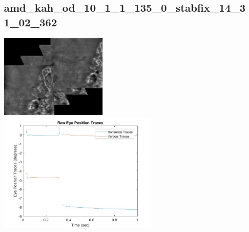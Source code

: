 \documentclass[11pt]{article}
\begin{document}
\subsection{amd\_kah\_od\_10\_1\_1\_135\_0\_stabfix\_14\_31\_02\_362}
\includegraphics[width=0.40\textwidth, valign=m]{referenceframes/tslo_amd/amd_kah_od_10_1_1_135_0_stabfix_14_31_02_362_dwt_nostim_gamscaled_bandfilt_refframe.jpg}
\includegraphics[width=0.60\textwidth, valign=m]{eyepositiontraces/tslo_amd/amd_kah_od_10_1_1_135_0_stabfix_14_31_02_362.jpg}\\
\end{document}
